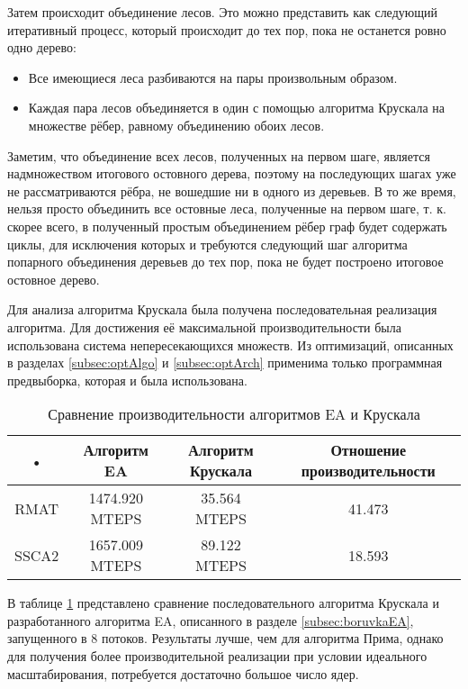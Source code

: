 \documentclass[a4paper,12pt]{extarticle}
\begin{document}
Затем происходит объединение лесов. Это можно представить как следующий итеративный процесс, который происходит до тех пор, пока не останется ровно одно дерево:
\begin{itemize}
    \item Все имеющиеся леса разбиваются на пары произвольным образом.
    \item Каждая пара лесов объединяется в один с помощью алгоритма Крускала на множестве рёбер, равному объединению обоих лесов.
\end{itemize}

Заметим, что объединение всех лесов, полученных на первом шаге, является надмножеством итогового остовного дерева, поэтому на последующих шагах уже не рассматриваются рёбра, не вошедшие ни в одного из деревьев.
В то же время, нельзя просто объединить все остовные леса, полученные на первом шаге, т. к. скорее всего, в полученный простым объединением рёбер граф будет содержать циклы, для исключения которых и требуются следующий шаг алгоритма попарного объединения деревьев до тех пор, пока не будет построено итоговое остовное дерево.

Для анализа алгоритма Крускала была получена последовательная реализация алгоритма.
Для достижения её максимальной производительности была использована система непересекающихся множеств.
Из оптимизаций, описанных в разделах \ref{subsec:optAlgo} и \ref{subsec:optArch} применима только программная предвыборка, которая и была использована.

\begin{table}
    \caption{Сравнение производительности алгоритмов EA и Крускала}
    \label{tabel:kruskalSeq}
    \begin{center}
        \begin{tabular}{|c|c|c|c|}
            \hline 
            \rule[-1ex]{0pt}{2.5ex} • & Алгоритм EA & Алгоритм Крускала & Отношение производительности \\ 
            \hline 
            \rule[-1ex]{0pt}{2.5ex} RMAT & 1474.920 MTEPS & 35.564 MTEPS & 41.473 \\ 
            \hline 
            \rule[-1ex]{0pt}{2.5ex} SSCA2 & 1657.009 MTEPS & 89.122 MTEPS & 18.593 \\ 
            \hline 
        \end{tabular}
    \end{center}
\end{table} 

В таблице \ref{tabel:kruskalSeq} представлено сравнение последовательного алгоритма Крускала и разработанного алгоритма EA, описанного в разделе \ref{subsec:boruvkaEA}, запущенного в 8 потоков.
Результаты лучше, чем для алгоритма Прима, однако для получения более производительной реализации при условии идеального масштабирования, потребуется достаточно большое число ядер.
\end{document}
